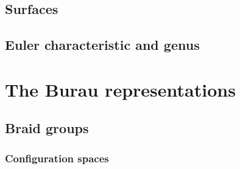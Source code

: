\nocite{*}




\subsection{Surfaces}





\subsection{Euler characteristic and genus}








\section{The Burau representations}

\subsection{Braid groups}

\subsubsection{Configuration spaces}







